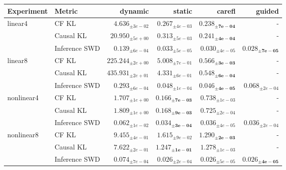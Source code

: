 \begin{tabular}{llrrrr}
\toprule
Experiment & Metric & dynamic & static & carefl & guided \\
\midrule
linear4 & CF KL & $4.636_{\pm 3e-02}$ & $0.267_{\pm 4e-03}$ & $\mathbf{0.238_{\pm 7e-04}}$ & - \\
 & Causal KL & $20.950_{\pm 5e+00}$ & $0.313_{\pm 5e-03}$ & $\mathbf{0.241_{\pm 4e-04}}$ & - \\
 & Inference SWD & $0.139_{\pm 6e-04}$ & $0.033_{\pm 5e-05}$ & $0.030_{\pm 4e-05}$ & $\mathbf{0.028_{\pm 7e-05}}$ \\
linear8 & CF KL & $225.244_{\pm 2e+00}$ & $5.008_{\pm 7e-01}$ & $\mathbf{0.566_{\pm 3e-03}}$ & - \\
 & Causal KL & $435.931_{\pm 2e+01}$ & $4.331_{\pm 6e-01}$ & $\mathbf{0.548_{\pm 6e-04}}$ & - \\
 & Inference SWD & $0.293_{\pm 6e-04}$ & $0.048_{\pm 1e-04}$ & $\mathbf{0.046_{\pm 4e-05}}$ & $0.068_{\pm 2e-04}$ \\
nonlinear4 & CF KL & $1.707_{\pm 1e+00}$ & $\mathbf{0.166_{\pm 7e-03}}$ & $0.738_{\pm 1e-03}$ & - \\
 & Causal KL & $1.809_{\pm 1e+00}$ & $\mathbf{0.168_{\pm 9e-03}}$ & $0.725_{\pm 2e-04}$ & - \\
 & Inference SWD & $0.062_{\pm 1e-02}$ & $\mathbf{0.034_{\pm 3e-04}}$ & $0.036_{\pm 4e-05}$ & $0.036_{\pm 2e-04}$ \\
nonlinear8 & CF KL & $9.455_{\pm 4e-01}$ & $1.615_{\pm 9e-02}$ & $\mathbf{1.290_{\pm 2e-03}}$ & - \\
 & Causal KL & $7.622_{\pm 2e-01}$ & $\mathbf{1.247_{\pm 1e-01}}$ & $1.278_{\pm 1e-03}$ & - \\
 & Inference SWD & $0.074_{\pm 7e-04}$ & $0.026_{\pm 2e-04}$ & $0.026_{\pm 5e-05}$ & $\mathbf{0.026_{\pm 4e-05}}$ \\
\bottomrule
\end{tabular}